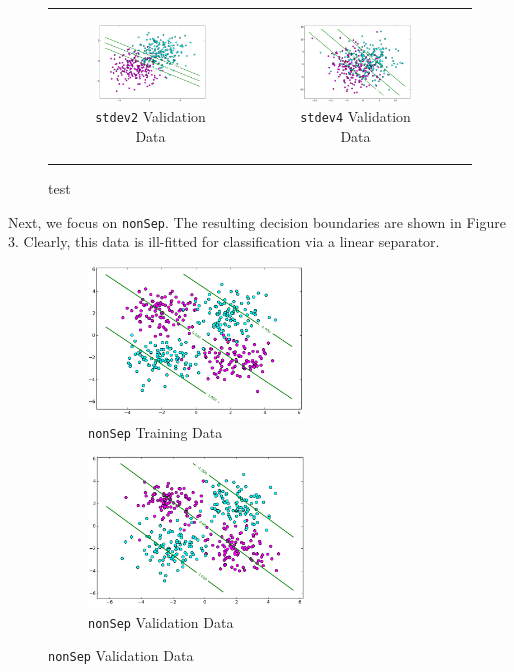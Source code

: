 \documentclass{sigchi}
\begin{document}
\begin{figure}[!ht]
\begin{tabular}{c c c}
\begin{subfigure}[b]{2.25in}
	\includegraphics[width=2.25in]{plots/1-2/stdev2valid.png}
	\caption{\texttt{stdev2} Validation Data}
\end{subfigure} &

\begin{subfigure}[b]{2.25in}
	\includegraphics[width=2.25in]{plots/1-2/stdev4valid.png}
	\caption{\texttt{stdev4} Validation Data}
\end{subfigure} \\
\end{tabular}
\caption{test}
\end{figure}

Next, we focus on \texttt{nonSep}. The resulting decision boundaries are shown in Figure 3. Clearly, this data is ill-fitted for classification via a linear separator.

\begin{figure}
\centering

\begin{subfigure}[b]{2.25in}
	\includegraphics[width = 2.25in]{plots/1-2/nonSep2train.png}
	\caption{\texttt{nonSep} Training Data}
\end{subfigure}

\begin{subfigure}[b]{2.25in}
	\includegraphics[width = 2.25in]{plots/1-2/nonSep2valid.png}
	\caption{\texttt{nonSep} Validation Data}
\end{subfigure}

\end{figure}
\end{document}
